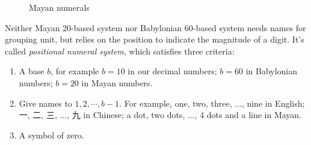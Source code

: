 \documentclass[b5paper]{article}
\begin{document}
\begin{figure}[htbp]
 \centering
 \caption{Mayan numerals}
 \label{fig:maya-numerals}
\end{figure}

Neither Mayan 20-based system nor Babylonian 60-based system needs names for grouping unit, but relies on the position to indicate the magnitude of a digit. It's called {\em positional numeral system}, which satisfies three criteria:

\begin{enumerate}[1)]
\item A base $b$, for example $b = 10$ in our decimal numbers; $b = 60$ in Babylonian numbers; $b = 20$ in Mayan numbers.
\item Give names to $1, 2, \cdots, b-1$. For example, one, two, three, ..., nine in English; 一, 二, 三, ..., 九 in Chinese; a dot, two dots, ..., 4 dots and a line in Mayan.
\item A symbol of zero.
\end{enumerate}
\end{document}
